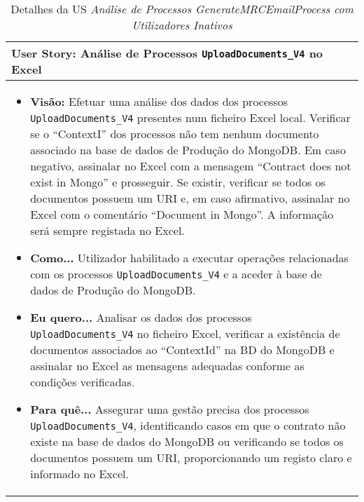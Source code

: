                 \begin{table}[htbp] %
                    \centering
                    \begin{tabularx}{1\textwidth}{|>{\raggedright\arraybackslash}X|}
                        \hline
                        \rowcolor{lightgray}
                        \textbf{User Story:} Análise de Processos \texttt{UploadDocuments\_V4} no Excel \\
                        \hline
                        \rowcolor{lightgray!20}
                                        
                        \begin{itemize}
                            \item \textbf{Visão:} Efetuar uma análise dos dados dos processos \texttt{UploadDocuments\_V4} presentes num ficheiro Excel local. Verificar se o ``ContextI'' dos processos não tem nenhum documento associado na base de dados de Produção do MongoDB. Em caso negativo, assinalar no Excel com a mensagem ``Contract does not exist in Mongo'' e prosseguir. Se existir, verificar se todos os documentos possuem um URI e, em caso afirmativo, assinalar no Excel com o comentário ``Document in Mongo''. A informação será sempre registada no Excel.

                            \item \textbf{Como...} Utilizador habilitado a executar operações relacionadas com os processos \texttt{UploadDocuments\_V4} e a aceder à base de dados de Produção do MongoDB.

                            \item \textbf{Eu quero...} Analisar os dados dos processos \texttt{UploadDocuments\_V4} no ficheiro Excel, verificar a existência de documentos associados ao ``ContextId'' na BD do MongoDB e assinalar no Excel as mensagens adequadas conforme as condições verificadas.

                            \item \textbf{Para quê...} Assegurar uma gestão precisa dos processos \texttt{UploadDocuments\_V4}, identificando casos em que o contrato não existe na base de dados do MongoDB ou verificando se todos os documentos possuem um URI, proporcionando um registo claro e informado no Excel.
                        \end{itemize}
                        \\
                        \hline
                    \end{tabularx}
                    \caption{Detalhes da US \textit{Análise de Processos GenerateMRCEmailProcess com Utilizadores Inativos}}\label{table:python_us3}
                \end{table}

